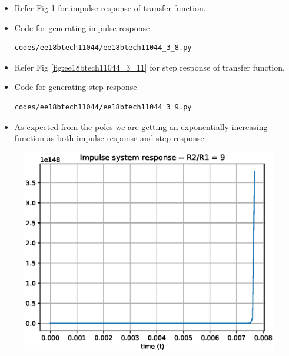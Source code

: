 \begin{enumerate}[label=\arabic*.,ref=\theenumi]
\begin{itemize}
\item Refer Fig \ref{fig:ee18btech11044_3_10} for impulse response of transfer function.
\item Code for generating impulse response
\begin{lstlisting}
codes/ee18btech11044/ee18btech11044_3_8.py
\end{lstlisting}
\item Refer Fig \ref{fig:ee18btech11044_3_11} for step response of transfer function.
\item Code for generating step response
\begin{lstlisting}
codes/ee18btech11044/ee18btech11044_3_9.py
\end{lstlisting}
\item As expected from the poles we are getting an exponentially increasing function as both impulse response and step response.
\end{itemize}

\begin{figure}[!ht]
\centering
\includegraphics[width=\columnwidth]{./figs/ee18btech11044/ee18btech11044_3_10.eps}
\caption{}
\label{fig:ee18btech11044_3_10}
\end{figure}


\end{enumerate}
